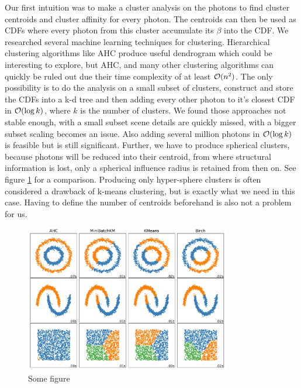 Our first intuition was to make a cluster analysis on the photons to find cluster centroids and cluster affinity for every photon. The centroids can then be used as CDFs where every photon from this cluster accumulate its $\beta$ into the CDF. We researched several machine learning techniques for clustering. Hierarchical clustering algorithms like AHC produce useful dendrogram which could be interesting to explore, but AHC, and many other clustering algorithms can quickly be ruled out due their time complexity of at least $\mathcal{O}(n^2)$. The only possibility is to do the analysis on a small subset of clusters, construct and store the CDFs into a k-d tree and then adding every other photon to it's closest CDF in $\mathcal{O}(\log k)$, where $k$ is the number of clusters. We found those approaches not stable enough, with a small subset scene details are quickly missed, with a bigger subset scaling becomes an issue. Also adding several million photons in $\mathcal{O}(\log k)$ is feasible but is still significant. Further, we have to produce spherical clusters, because photons will be reduced into their centroid, from where structural information is lost, only a spherical influence radius is retained from then on. See figure \ref{fig:clustering} for a comparison. Producing only hyper-sphere clusters is often considered a drawback of k-means clustering, but is exactly what we need in this case. Having to define the number of centroids beforehand is also not a problem for us.

\begin{figure}
    \centering
    \includegraphics[width=0.8\textwidth]{figures/plots/mlclustering.pdf}
    \caption{Some figure}
    \label{fig:clustering}
\end{figure}
    
